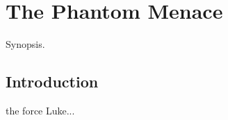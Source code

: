 
\chapter{The Phantom Menace}
	\label{chapter:phantom-menace}%



\begin{synopsis}
	Synopsis.
\end{synopsis}


\section{Introduction}

 the force Luke...

